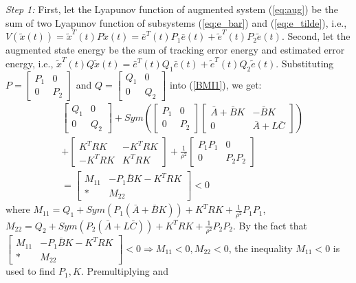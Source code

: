 \documentclass{ieeeaccess}
\begin{document}
\textit{Step 1:} First, let the Lyapunov function of augmented system (\ref{eq:aug}) be the sum of two Lyapunov function of subsystems (\ref{eq:e_bar}) and (\ref{eq:e_tilde}), i.e., $V(\tilde{x}(t))=\tilde{x}^T(t)P\tilde{x}(t)=\bar{e}^T(t)P_1\bar{e}(t)+\tilde{e}^T(t)P_2\tilde{e}(t)$. Second, let the augmented state energy be the sum of tracking error energy and estimated error energy, i.e., $\tilde{x}^T(t)Q\tilde{x}(t)=\bar{e}^T(t)Q_1\bar{e}(t)+\tilde{e}^T(t)Q_2\tilde{e}(t)$. Substituting $P=\begin{bmatrix}
    P_1 & 0 \\ 0 & P_2
\end{bmatrix}$ and $Q=\begin{bmatrix}
    Q_1 & 0 \\ 0 & Q_2
\end{bmatrix}$ into (\ref{BMI1}), we get:
\begin{equation} \label{eq:M}
    \begin{split}
        & \begin{bmatrix}
            Q_1 & 0 \\ 0 & Q_2
        \end{bmatrix} + Sym(\begin{bmatrix}
            P_1 & 0 \\ 0 & P_2
        \end{bmatrix}\begin{bmatrix}
            \bar{A}+\bar{B}K & -\bar{B}K \\ 0 & \bar{A}+L\bar{C}
        \end{bmatrix})  \\
        & + \begin{bmatrix}
            K^TRK & -K^TRK \\ -K^TRK & K^TRK
        \end{bmatrix} + \frac{1}{\rho^2}\begin{bmatrix}
            P_1P_1 & 0 \\ 0 & P_2P_2
        \end{bmatrix} \\
        & = \begin{bmatrix}
            M_{11} & -P_1\bar{B}K - K^TRK \\ * & M_{22}
        \end{bmatrix} < 0
    \end{split}
\end{equation}
where $M_{11}=Q_1+Sym(P_1(\bar{A}+\bar{B}K)) + K^TRK + \frac{1}{\rho^2}P_1P_1$, $M_{22}=Q_2+Sym(P_2(\bar{A}+L\bar{C})) + K^TRK + \frac{1}{\rho^2}P_2P_2$. By the fact that $\begin{bmatrix}
    M_{11} & -P_1\bar{B}K - K^TRK \\ * & M_{22}
\end{bmatrix} < 0 \Rightarrow M_{11}<0, M_{22}<0$, the inequality $M_{11}<0$ is used to find $P_1,K$. Premultiplying and
\end{document}

